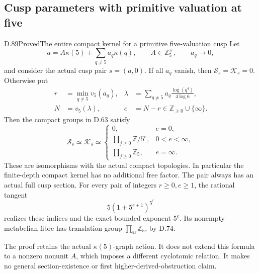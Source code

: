 \subsection{Cusp parameters with primitive valuation at five}

\begin{statement}{D.89}{Proved}{The entire compact kernel for a primitive five-valuation cusp}
Let
\[
 a=A\kappa(5)+\sum_{q\ne5}a_q\kappa(q),\qquad
 A\in\mathbb Z_5^\times,\qquad a_q\longrightarrow0,
\]
and consider the actual cusp pair \(s=(a,0)\).
If all \(a_q\) vanish, then \(\mathcal S_s=\mathcal K_s=0\).
Otherwise put
\[
 \begin{aligned}
 r&=\min_{q\ne5}v_5(a_q),&
 \lambda&=\sum_{q\ne5}a_q\frac{\log(q^4)}{4\log6},\\
 N&=v_5(\lambda),&e&=N-r\in\mathbb Z_{\ge0}\cup\{\infty\}.
 \end{aligned}                                             \tag{D.89.1}
\]
Then the compact groups in D.63 satisfy
\[
 \mathcal S_s\simeq\mathcal K_s\simeq
 \begin{cases}
  0,&e=0,\\
  \displaystyle\prod_{j\ge0}\mathbb Z/5^e,&0<e<\infty,\\
  \displaystyle\prod_{j\ge0}\mathbb Z_5,&e=\infty.
 \end{cases}                                               \tag{D.89.2}
\]
These are isomorphisms with the actual compact topologies.
In particular the finite-depth compact kernel has no additional
free factor. The pair always has an actual full cusp section.
For every pair of integers \(r\ge0,e\ge1\), the rational
tangent
\[
                  5(1+5^{e+1})^{5^r}                     \tag{D.89.3}
\]
realizes these indices and the exact bounded exponent \(5^e\).
Its nonempty metabelian fibre has translation group
\(\prod_{\mathbb N}\mathbb Z_5\), by D.74.

The proof retains the actual \(\kappa(5)\)-graph action.
It does not extend this formula to a nonzero nonunit \(A\),
which imposes a different cyclotomic relation. It makes no
general section-existence or first higher-derived-obstruction claim.
\end{statement}

